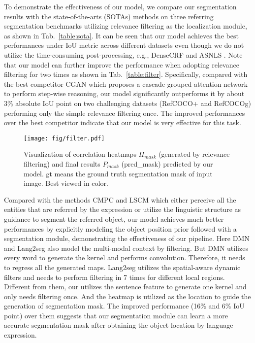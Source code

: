 To demonstrate the effectiveness of our model, we compare our segmentation results with the state-of-the-arts (SOTAs) methods on three referring segmentation benchmarks utilizing relevance filtering as the localization module, as shown in Tab.~\ref{table:sota}. It can be seen that our model achieves the best performances under IoU metric across different datasets even though we do not utilize the time-consuming post-processing, e.g., DenseCRF \cite{krahenbuhl2011efficient} and ASNLS \cite{luo2020multi}. Note that our model can further improve the performance when adopting relevance filtering for two times as shown in Tab.~\ref{table:filter}. Specifically, compared with the best competitor CGAN \cite{luo2020cascade} which proposes a cascade grouped attention network to perform step-wise reasoning, our model significantly outperforms it by about 3\% absolute IoU point on two challenging datasets (RefCOCO+ and RefCOCOg) performing only the simple relevance filtering once. The improved performances over the best competitor indicate that our model is very effective for this task.

\begin{figure*}[t]
\centering
\texttt{[image: fig/filter.pdf]}
\caption{Visualization of correlation heatmaps $H_{mask}$ (generated by relevance filtering) and final results $P_{mask}$ (pred\_mask) predicted by our model. gt means the ground truth segmentation mask of input image. Best viewed in color.}
\label{fig:filter}
\end{figure*}

Compared with the methods CMPC \cite{huang2020referring} and LSCM \cite{huilinguistic} which either perceive all the entities that are referred by the expression or utilize the linguistic structure as guidance to segment the referred object, our model achieves much better performances by explicitly
modeling the object position prior followed with a segmentation module, demonstrating the effectiveness of our pipeline. Here DMN \cite{margffoy2018dynamic} and Lang2seg \cite{chen2019referring} also model the multi-modal context by filtering.
But DMN utilizes every word to generate the kernel and performs convolution. Therefore, it needs to regress all the generated maps. Lang2seg utilizes the spatial-aware dynamic filters and needs to perform filtering in 7 times for different local regions. Different from them, our \method utilizes the sentence feature to generate one kernel and only needs filtering once. And the heatmap is utilized as the location to guide the generation of segmentation mask. 
The improved performance (16\% and 6\% IoU point) over them suggests that our segmentation module can learn a more accurate segmentation mask after obtaining the object location by language expression. 











